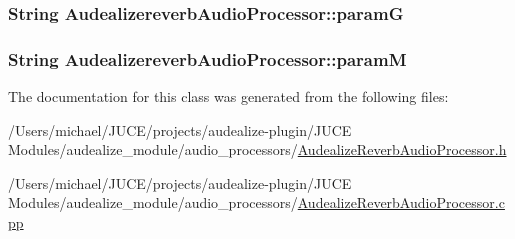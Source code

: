 \subsubsection[{\texorpdfstring{paramG}{paramG}}]{\setlength{\rightskip}{0pt plus 5cm}String Audealizereverb\+Audio\+Processor\+::paramG\hspace{0.3cm}{\ttfamily [static]}}\hypertarget{class_audealize_1_1_audealizereverb_audio_processor_a2a3fc9c4b12a08e68aa8457cae9ce3ff}{}\label{class_audealize_1_1_audealizereverb_audio_processor_a2a3fc9c4b12a08e68aa8457cae9ce3ff}
\subsubsection[{\texorpdfstring{paramM}{paramM}}]{\setlength{\rightskip}{0pt plus 5cm}String Audealizereverb\+Audio\+Processor\+::paramM\hspace{0.3cm}{\ttfamily [static]}}\hypertarget{class_audealize_1_1_audealizereverb_audio_processor_a3e3ec2690abdac5cbca63fccd0f0d362}{}\label{class_audealize_1_1_audealizereverb_audio_processor_a3e3ec2690abdac5cbca63fccd0f0d362}


The documentation for this class was generated from the following files\+:\begin{DoxyCompactItemize}
\item 
/\+Users/michael/\+J\+U\+C\+E/projects/audealize-\/plugin/\+J\+U\+C\+E Modules/audealize\+\_\+module/audio\+\_\+processors/\hyperlink{_audealize_reverb_audio_processor_8h}{Audealize\+Reverb\+Audio\+Processor.\+h}\item 
/\+Users/michael/\+J\+U\+C\+E/projects/audealize-\/plugin/\+J\+U\+C\+E Modules/audealize\+\_\+module/audio\+\_\+processors/\hyperlink{_audealize_reverb_audio_processor_8cpp}{Audealize\+Reverb\+Audio\+Processor.\+cpp}\end{DoxyCompactItemize}
